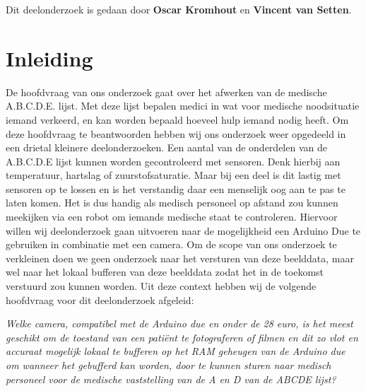 \documentclass{article}
\begin{document}
Dit deelonderzoek is gedaan door \textbf{Oscar Kromhout} en \textbf{Vincent van Setten}.

\section{Inleiding}
De hoofdvraag van ons onderzoek gaat over het afwerken van de medische A.B.C.D.E. lijst. Met deze lijst bepalen medici in wat voor medische noodsituatie iemand verkeerd, en kan worden bepaald hoeveel hulp iemand nodig heeft. Om deze hoofdvraag te beantwoorden hebben wij ons onderzoek weer opgedeeld in een drietal kleinere deelonderzoeken.  
Een aantal van de onderdelen van de A.B.C.D.E lijst kunnen worden gecontroleerd met sensoren. Denk hierbij aan temperatuur, hartslag of zuurstofsaturatie. Maar bij een deel is dit lastig met sensoren op te lossen en is het verstandig daar een menselijk oog aan te pas te laten komen. Het is dus handig als medisch personeel op afstand zou kunnen meekijken via een robot om iemands medische staat te controleren. Hiervoor willen wij deelonderzoek gaan uitvoeren naar de mogelijkheid een Arduino Due te gebruiken in combinatie met een camera. Om de scope van ons onderzoek te verkleinen doen we geen onderzoek naar het versturen van deze beelddata, maar wel naar het lokaal bufferen van deze beelddata zodat het in de toekomst verstuurd zou kunnen worden. 
Uit deze context hebben wij de volgende hoofdvraag voor dit deelonderzoek afgeleid: 

\textit{Welke camera, compatibel met de Arduino due en onder de 28 euro, is het meest geschikt om de toestand van een patiënt te fotograferen of filmen en dit zo vlot en accuraat mogelijk lokaal te bufferen op het RAM geheugen van de Arduino due om wanneer het gebufferd kan worden, door te kunnen sturen naar medisch personeel voor de medische vaststelling van de A en D van de ABCDE lijst? }
\end{document}
